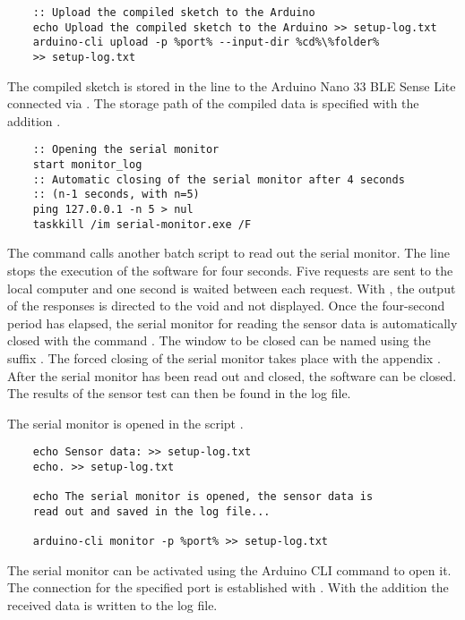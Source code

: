 \begin{lstlisting}
    :: Upload the compiled sketch to the Arduino
    echo Upload the compiled sketch to the Arduino >> setup-log.txt
    arduino-cli upload -p %port% --input-dir %cd%\%folder% 
    >> setup-log.txt
\end{lstlisting}

The compiled sketch is stored in the line    to the Arduino Nano 33 BLE Sense Lite connected via . The storage path of the compiled data is specified with the addition .

\begin{lstlisting}
    :: Opening the serial monitor
    start monitor_log
    :: Automatic closing of the serial monitor after 4 seconds 
    :: (n-1 seconds, with n=5)
    ping 127.0.0.1 -n 5 > nul
    taskkill /im serial-monitor.exe /F
\end{lstlisting}

The command  calls another batch script to read out the serial monitor. The line  stops the execution of the software for four seconds. Five requests are sent to the local computer and one second is waited between each request. With , the output of the responses is directed to the void and not displayed. Once the four-second period has elapsed, the serial monitor for reading the sensor data is automatically closed with the command . The window to be closed can be named  using the suffix . The forced closing of the serial monitor takes place with the appendix . After the serial monitor has been read out and closed, the software can be closed. The results of the sensor test can then be found in the log file.

The serial monitor is opened in the script .

\begin{lstlisting}
    echo Sensor data: >> setup-log.txt
    echo. >> setup-log.txt
    
    echo The serial monitor is opened, the sensor data is 
    read out and saved in the log file...
    
    arduino-cli monitor -p %port% >> setup-log.txt
\end{lstlisting}	

The serial monitor can be activated using the Arduino CLI command   to open it. The connection for the specified port is established with . With the addition  the received data is written to the log file.
